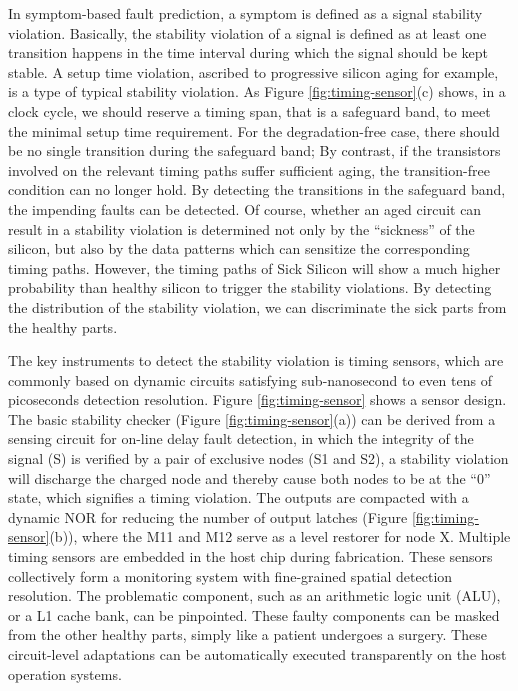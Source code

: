 In symptom-based fault prediction, a symptom is defined as a signal stability violation. Basically, the stability violation of a signal is defined as at least one transition happens in the time interval during which the signal should be kept stable. A setup time violation, ascribed to progressive silicon aging for example, is a type of typical stability violation. As Figure \ref{fig:timing-sensor}(c) shows, in a clock cycle, we should reserve a timing span, that is a safeguard band, to meet the minimal setup time requirement. For the degradation-free case, there should be no single transition during the safeguard band; By contrast, if the transistors involved on the relevant timing paths suffer sufficient aging, the transition-free condition can no longer hold. By detecting the transitions in the safeguard band, the impending faults can be detected. Of course, whether an aged circuit can result in a stability violation is determined not only by the “sickness” of the silicon, but also by the data patterns which can sensitize the corresponding timing paths. However, the timing paths of Sick Silicon will show a much higher probability than healthy silicon to trigger the stability violations. By detecting the distribution of the stability violation, we can discriminate the sick parts from the healthy parts. 

The key instruments to detect the stability violation is timing sensors, which are commonly based on dynamic circuits satisfying sub-nanosecond to even tens of picoseconds detection resolution. Figure \ref{fig:timing-sensor} shows a sensor design. The basic stability checker (Figure \ref{fig:timing-sensor}(a)) can be derived from a sensing circuit for on-line delay fault detection, in which the integrity of the signal (S) is verified by a pair of exclusive nodes (S1 and S2), a stability violation will discharge the charged node and thereby cause both nodes to be at the “0” state, which signifies a timing violation. The outputs are compacted with a dynamic NOR for reducing the number of output latches (Figure \ref{fig:timing-sensor}(b)), where the M11 and M12 serve as a level restorer for node X. Multiple timing sensors are embedded in the host chip during fabrication. These sensors collectively form a monitoring system with fine-grained spatial detection resolution. The problematic component, such as an arithmetic logic unit (ALU), or a L1 cache bank, can be pinpointed. These faulty components can be masked from the other healthy parts, simply like a patient undergoes a surgery. These circuit-level adaptations can be automatically executed transparently on the host operation systems.

